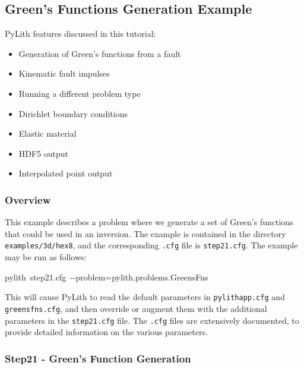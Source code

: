 
\subsection{\label{sec:Tutorial-3d-hex8-greensfns}Green's Functions Generation
Example}

PyLith features discussed in this tutorial:
\begin{itemize}
\item Generation of Green's functions from a fault
\item Kinematic fault impulses
\item Running a different problem type
\item Dirichlet boundary conditions
\item Elastic material
\item HDF5 output
\item Interpolated point output
\end{itemize}

\subsubsection{Overview}

This example describes a problem where we generate a set of Green's
functions that could be used in an inversion. The example is contained
in the directory \texttt{examples/3d/hex8}, and the corresponding
\texttt{.cfg} file is \texttt{step21.cfg}. The example may be run
as follows:
\begin{lyxcode}
pylith~step21.cfg~-{}-problem=pylith.problems.GreensFns
\end{lyxcode}
This will cause PyLith to read the default parameters in \texttt{pylithapp.cfg}
and \texttt{greensfns.cfg}, and then override or augment them with
the additional parameters in the \texttt{step21.cfg} file. The \texttt{.cfg}
files are extensively documented, to provide detailed information
on the various parameters.


\subsubsection{Step21 - Green's Function Generation}

